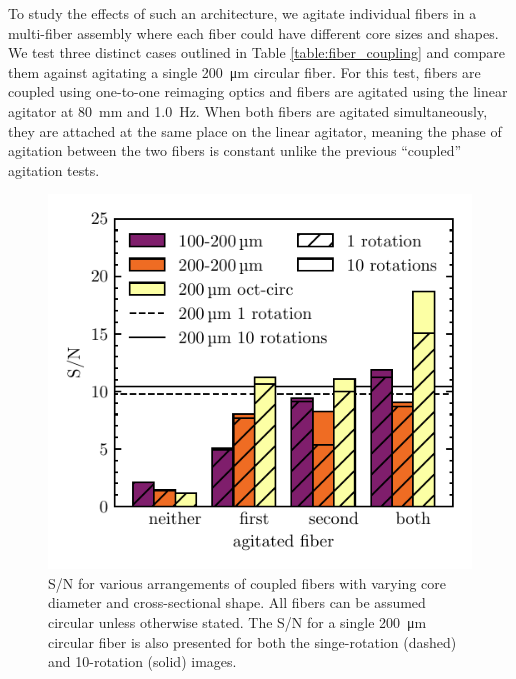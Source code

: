 To study the effects of such an architecture, we agitate individual fibers in a multi-fiber assembly where each fiber could have different core sizes and shapes. We test three distinct cases outlined in Table \ref{table:fiber_coupling} and compare them against agitating a single \SI{200}{\micro\meter} circular fiber. For this test, fibers are coupled using one-to-one reimaging optics and fibers are agitated using the linear agitator at \SI{80}{\milli\meter} and \SI{1.0}{\hertz}. When both fibers are agitated simultaneously, they are attached at the same place on the linear agitator, meaning the phase of agitation between the two fibers is constant unlike the previous ``coupled'' agitation tests.

\begin{figure}
\centering
	\includegraphics[width=0.7\columnwidth]{figures-2/coupled_fibers.pdf}
	\caption[Signal-to-noise comparison across fiber shapes]{S/N for various arrangements of coupled fibers with varying core diameter and cross-sectional shape. All fibers can be assumed circular unless otherwise stated. The S/N for a single \SI{200}{\micro\meter} circular fiber is also presented for both the singe-rotation (dashed) and 10-rotation (solid) images.}
\label{fig:coupled_fibers}
\end{figure}

